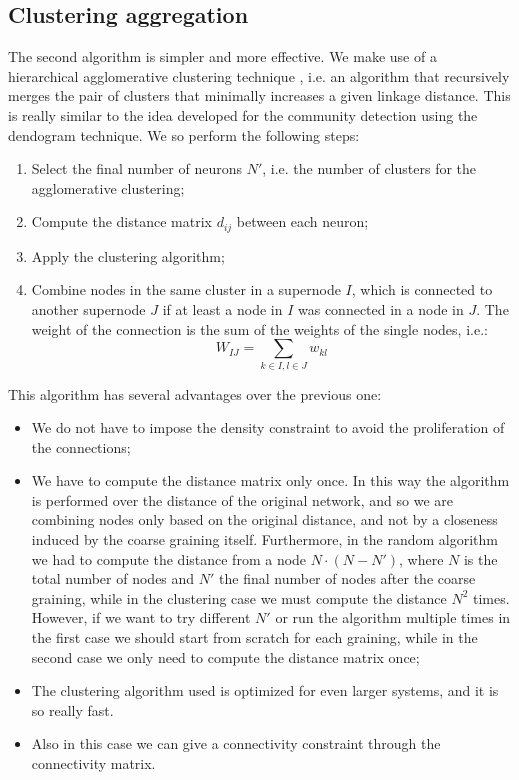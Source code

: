 \subsection{Clustering aggregation \label{subsec:clust}}
The second algorithm is simpler and more effective. We make use of a hierarchical agglomerative
clustering technique \cite{scikit-learn}, i.e. an algorithm that recursively merges the pair of clusters that 
minimally increases a given linkage distance. This is really similar to the idea developed 
for the community detection using the dendogram technique.
We so perform the following steps:
\begin{enumerate}
    \item Select the  final number of neurons $N'$, i.e. the number of clusters for the agglomerative
        clustering;
    \item Compute the distance matrix $d_{ij}$ between each neuron;
    \item Apply the clustering algorithm;
    \item Combine nodes in the same cluster in a supernode $I$, which is connected to another 
        supernode $J$ if at least a node in $I$ was connected in a node in $J$. The weight of the 
        connection is the sum of the weights of the single nodes, i.e.:
        $$
        W_{IJ} = \sum_{k\in I, l\in J} w_{kl}
        $$
\end{enumerate}
This algorithm has several advantages over the previous one:
\begin{itemize}
    \item We do not have to impose the density constraint to avoid the proliferation of the 
        connections;
    \item We have to compute the distance matrix only once. 
        In this way the algorithm
        is performed over the distance of the original network, and so we are combining
        nodes only based on the original distance, and not by a closeness induced by the 
        coarse graining itself.
        Furthermore, in the random algorithm we had to compute the distance from a node $N\cdot (N-N')$,
        where $N$ is the total number of nodes and $N'$ the final number of nodes after the 
        coarse graining, while in the clustering case we must compute the distance $N^2$ times.
        However, if we want to try different $N'$ or run the algorithm multiple times in the 
        first case we should start from scratch for each graining, while in the second case
        we only need to compute the distance matrix once;
    \item The clustering algorithm used is optimized for even larger systems, and it is so really
        fast.
    \item Also in this case we can give a connectivity constraint through the connectivity
     matrix.
\end{itemize}


